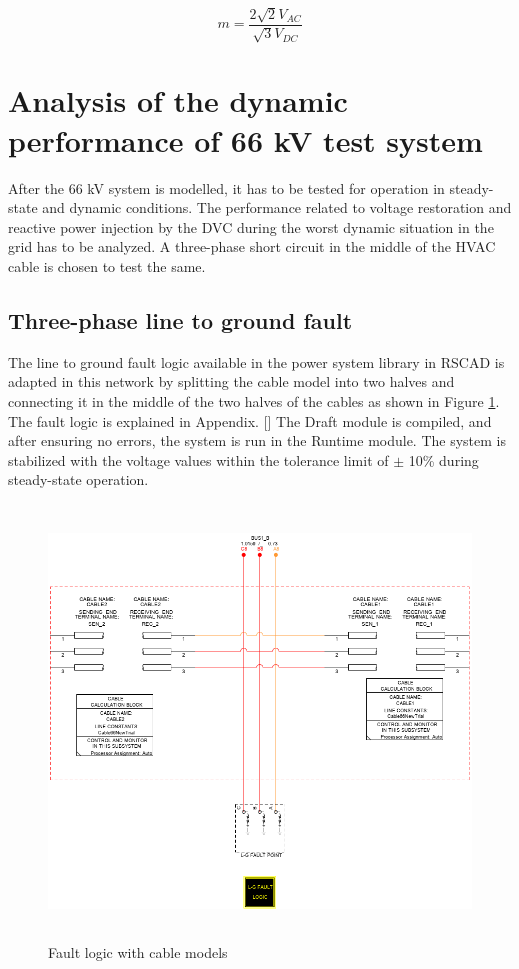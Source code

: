 \begin{equation}\label{MI_eq}
    m = \frac{2\sqrt{2} V_{AC}}{\sqrt{3} {V_{DC}}}
\end{equation}

\section{Analysis of the dynamic performance of 66 kV test system}
After the 66 kV system is modelled, it has to be tested for operation in steady-state and dynamic conditions. The performance related to voltage restoration and reactive power injection by the \gls{DVC} during the worst dynamic situation in the grid has to be analyzed. A three-phase short circuit in the middle of the \gls{HVAC} cable is chosen to test the same.

\subsection{Three-phase line to ground fault}

The line to ground fault logic available in the power system library in RSCAD is adapted in this network by splitting the cable model into two halves and connecting it in the middle of the two halves of the cables as shown in Figure \ref{fig:2cablesblockwithfault}. The fault logic is explained in Appendix. [] 
The Draft module is compiled, and after ensuring no errors, the system is run in the Runtime module. The system is stabilized with the voltage values within the tolerance limit of $\pm$ 10\% during steady-state operation.

\begin{figure}[H]
\centering
    \includegraphics[height = 11.5cm,width = 12.5cm]{Diagrams/Chapter_3/2CablesBlockWithFault.png}
    \caption{Fault logic with cable models}
    \label{fig:2cablesblockwithfault}
\end{figure}

